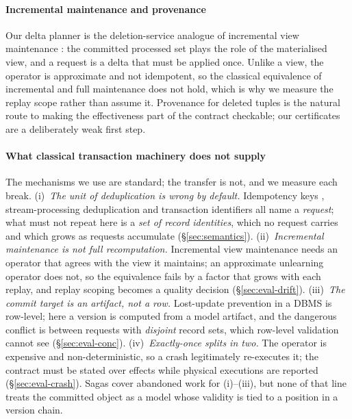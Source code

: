\documentclass[conference]{IEEEtran}
\begin{document}
\paragraph{Incremental maintenance and provenance}
Our delta planner is the deletion-service analogue of incremental view maintenance
\cite{gupta1995maintenance}: the committed processed set plays the role of the
materialised view, and a request is a delta that must be applied once.  Unlike a
view, the operator is approximate and not idempotent, so the classical
equivalence of incremental and full maintenance does not hold, which is why we
measure the replay scope rather than assume it.  Provenance for deleted tuples
\cite{buneman2002propagation,green2007provenance,wu2020priu} is the natural route to
making the effectiveness part of the contract checkable; our certificates are a
deliberately weak first step.

\paragraph{What classical transaction machinery does not supply}
The mechanisms we use are standard; the transfer is not, and we measure each break.
(i)~\emph{The unit of deduplication is wrong by default.}  Idempotency keys
\cite{helland2012idempotence}, stream-processing deduplication \cite{carbone2015apache}
and transaction identifiers all name a \emph{request}; what must not repeat here is a
\emph{set of record identities}, which no request carries and which grows as requests
accumulate (\S\ref{sec:semantics}).  (ii)~\emph{Incremental maintenance is not full
recomputation.}  Incremental view maintenance \cite{gupta1995maintenance} needs an
operator that agrees with the view it maintains; an approximate unlearning operator does
not, so the equivalence fails by a factor that grows with each replay, and replay scoping
becomes a quality decision (\S\ref{sec:eval-drift}).  (iii)~\emph{The commit target is an
artifact, not a row.}  Lost-update prevention in a DBMS is row-level; here a version is
computed from a model artifact, and the dangerous conflict is between requests with
\emph{disjoint} record sets, which row-level validation cannot see
(\S\ref{sec:eval-conc}).  (iv)~\emph{Exactly-once splits in two.}  The operator is
expensive and non-deterministic, so a crash legitimately re-executes it; the contract must
be stated over effects while physical executions are reported
(\S\ref{sec:eval-crash}).  Sagas \cite{garciaMolina1987sagas} cover abandoned work for
(i)--(iii), but none of that line treats the committed object as a model whose validity is
tied to a position in a version chain.
\end{document}
